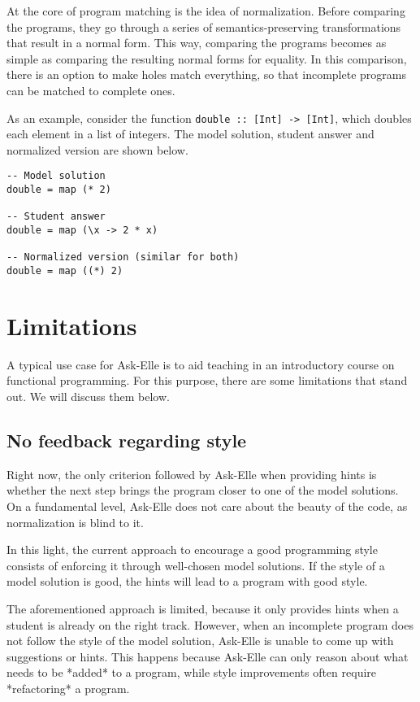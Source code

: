 At the core of program matching is the idea of normalization. Before comparing the programs, they go through a series of semantics-preserving transformations that result in a normal form. This way, comparing the programs becomes as simple as comparing the resulting normal forms for equality. In this comparison, there is an option to make holes match everything, so that incomplete programs can be matched to complete ones.

As an example, consider the function \texttt{double :: [Int] -> [Int]}, which doubles each element in a list of integers. The model solution, student answer and normalized version are shown below.

\begin{verbatim}
-- Model solution
double = map (* 2)

-- Student answer
double = map (\x -> 2 * x)

-- Normalized version (similar for both)
double = map ((*) 2)
\end{verbatim}

\section{Limitations}

A typical use case for Ask-Elle is to aid teaching in an introductory course on functional programming. For this purpose, there are some limitations that stand out. We will discuss them below.

\subsection{No feedback regarding style}

Right now, the only criterion followed by Ask-Elle when providing hints is whether the next step brings the program closer to one of the model solutions. On a fundamental level, Ask-Elle does not care about the beauty of the code, as normalization is blind to it.

In this light, the current approach to encourage a good programming style consists of enforcing it through well-chosen model solutions. If the style of a model solution is good, the hints will lead to a program with good style.

The aforementioned approach is limited, because it only provides hints when a student is already on the right track. However, when an incomplete program does not follow the style of the model solution, Ask-Elle is unable to come up with suggestions or hints. This happens because Ask-Elle can only reason about what needs to be *added* to a program, while style improvements often require *refactoring* a program.

